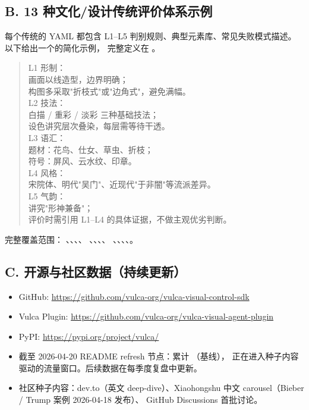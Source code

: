 \subsection*{B. 13 种文化/设计传统评价体系示例}

每个传统的 YAML 都包含 L1–L5 判别规则、典型元素库、常见失败模式描述。
以下给出一个的简化示例，
完整定义在 。

\begin{quote}
\small\ttfamily
L1 形制：\\
\quad 画面以线造型，边界明确；\\
\quad 构图多采取"折枝式"或"边角式"，避免满幅。\\
L2 技法：\\
\quad 白描 / 重彩 / 淡彩 三种基础技法；\\
\quad 设色讲究层次叠染，每层需等待干透。\\
L3 语汇：\\
\quad 题材：花鸟、仕女、草虫、折枝；\\
\quad 符号：屏风、云水纹、印章。\\
L4 风格：\\
\quad 宋院体、明代"吴门"、近现代"于非闇"等流派差异。\\
L5 气韵：\\
\quad 讲究"形神兼备"；\\
\quad 评价时需引用 L1–L4 的具体证据，不做主观优劣判断。
\end{quote}

完整覆盖范围：
、、、、
、、、、
、、、、。

\subsection*{C. 开源与社区数据（持续更新）}

\begin{itemize}
  \item GitHub: \url{https://github.com/vulca-org/vulca-visual-control-sdk}
  \item Vulca Plugin: \url{https://github.com/vulca-org/vulca-visual-agent-plugin}
  \item PyPI: \url{https://pypi.org/project/vulca/}
  \item 截至 2026-04-20 README refresh 节点：累计 （基线），
  正在进入种子内容驱动的流量窗口。后续数据在每季度复盘中更新。
  \item 社区种子内容：dev.to（英文 deep-dive）、Xiaohongshu 中文 carousel（Bieber / Trump 案例 2026-04-18 发布）、
  GitHub Discussions 首批讨论。
\end{itemize}


